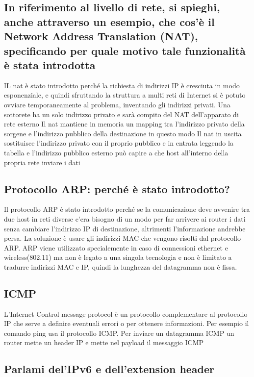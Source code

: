 \documentclass{article}
\begin{document}
    \subsection*{In riferimento al livello di rete, si spieghi, anche attraverso un esempio, che cos’è il Network Address Translation (NAT), specificando per quale motivo tale funzionalità è stata introdotta}
    
    IL nat è stato introdotto perché la richiesta di indirizzi IP è cresciuta in modo esponenziale, e quindi sfruttando la struttura a multi reti di Internet si è potuto ovviare temporaneamente al problema, inventando gli indirizzi privati.
    Una sottorete ha un solo indirizzo privato e sarà compito del NAT dell'apparato di rete esterno
    Il nat mantiene in memoria un mapping tra l'indirizzo privato della sorgene e l'indirizzo pubblico della destinazione
    in questo modo
    Il nat in uscita sostituisce l'indirizzo privato con il proprio pubblico
    e in entrata leggendo la tabella e l'indirizzo pubblico esterno può capire a che host all'interno della propria rete inviare i dati
    
    
    \subsection*{Protocollo ARP: perché è stato introdotto?}
    Il protocollo ARP è stato introdotto perché se la comunicazione deve avvenire tra due host in reti diverse c'era bisogno di un modo per far arrivere ai router i dati senza cambiare l'indirizzo IP di destinazione, altrimenti l'informazione andrebbe persa.
    La soluzione è usare gli indirizzi MAC che vengono risolti dal protocollo ARP.
    ARP viene utilizzato specialemente in caso di connessioni ethernet e wireless(802.11) ma non è legato a una singola tecnologia e non è limitato a tradurre indirizzi MAC e IP, quindi la lunghezza del datagramma non è fissa.
    
    \subsection*{ICMP}
    L'Internet Control message protocol è un protocollo complementare al protocollo IP che serve a definire eventuali errori o per ottenere informazioni.
    Per esempio il comando ping usa il protocollo ICMP.
    Per inviare un datagramma ICMP un router mette un header IP e mette nel payload il messaggio ICMP
    
    \subsection{Parlami del'IPv6 e dell'extension header}
    
\end{document}
